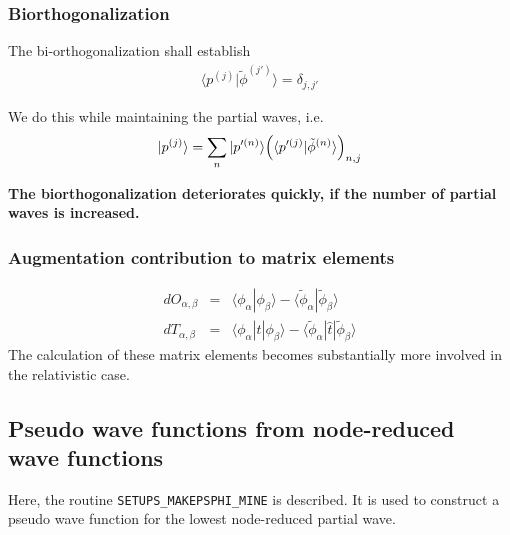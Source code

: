 \documentclass[11pt,a4paper]{report}
\begin{document}
\subsubsection{Biorthogonalization}
The bi-orthogonalization shall establish 
\begin{eqnarray}
\langle p^{(j)}|\tilde{\phi}^{(j')}\rangle=\delta_{j,j'}
\end{eqnarray}

We do this while maintaining the partial waves, i.e.
\begin{eqnarray}
|p^{(j)}\rangle=\sum_{n}|p'^{(n)}\rangle
\Bigl(\langle p'^{(j)}|\tilde{\phi}^{(n)}\rangle\Bigr)_{n,j}
\end{eqnarray}

\textbf{The biorthogonalization deteriorates quickly, if the number of
  partial waves is increased.}

\subsubsection{Augmentation contribution to matrix elements}

\begin{eqnarray}
dO_{\alpha,\beta}&=&\langle\phi_\alpha|\phi_\beta\rangle-
\langle\tilde{\phi}_\alpha|\tilde{\phi}_\beta\rangle
\nonumber\\
dT_{\alpha,\beta}&=&\langle\phi_\alpha|\hat{t}|\phi_\beta\rangle-
\langle\tilde{\phi}_\alpha|\hat{t}|\tilde{\phi}_\beta\rangle
\end{eqnarray}
The calculation of these matrix elements becomes substantially more
involved in the relativistic case.


\subsection{Pseudo wave functions from node-reduced wave functions}
\label{sec:determinedeltepseudo}
Here, the routine \verb|SETUPS_MAKEPSPHI_MINE| is described. It is used
to construct a pseudo wave function for the lowest node-reduced
partial wave.
\end{document}
